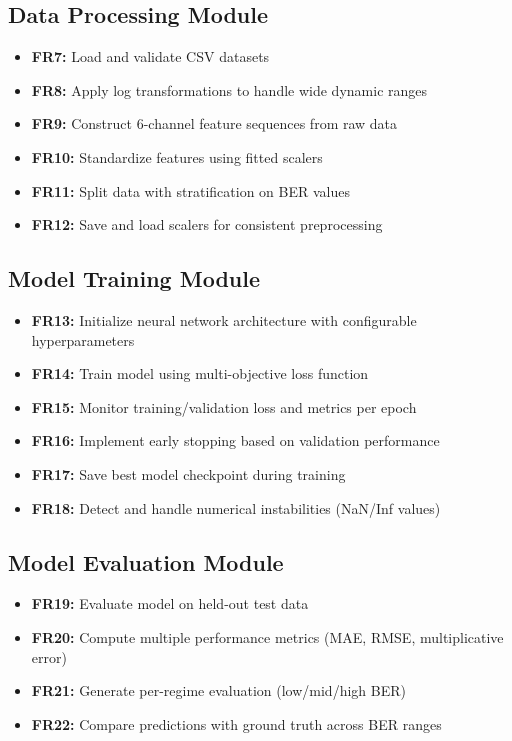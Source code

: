 \documentclass[a4paper,12pt]{report}
\begin{document}
\subsection{Data Processing Module}
\begin{itemize}
    \item \textbf{FR7:} Load and validate CSV datasets
    \item \textbf{FR8:} Apply log transformations to handle wide dynamic ranges
    \item \textbf{FR9:} Construct 6-channel feature sequences from raw data
    \item \textbf{FR10:} Standardize features using fitted scalers
    \item \textbf{FR11:} Split data with stratification on BER values
    \item \textbf{FR12:} Save and load scalers for consistent preprocessing
\end{itemize}

\subsection{Model Training Module}
\begin{itemize}
    \item \textbf{FR13:} Initialize neural network architecture with configurable hyperparameters
    \item \textbf{FR14:} Train model using multi-objective loss function
    \item \textbf{FR15:} Monitor training/validation loss and metrics per epoch
    \item \textbf{FR16:} Implement early stopping based on validation performance
    \item \textbf{FR17:} Save best model checkpoint during training
    \item \textbf{FR18:} Detect and handle numerical instabilities (NaN/Inf values)
\end{itemize}

\subsection{Model Evaluation Module}
\begin{itemize}
    \item \textbf{FR19:} Evaluate model on held-out test data
    \item \textbf{FR20:} Compute multiple performance metrics (MAE, RMSE, multiplicative error)
    \item \textbf{FR21:} Generate per-regime evaluation (low/mid/high BER)
    \item \textbf{FR22:} Compare predictions with ground truth across BER ranges
\end{itemize}
\end{document}
